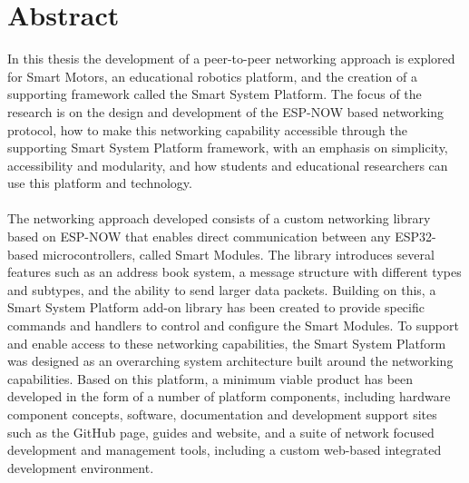 \chapter*{Abstract}%
%
%
%

In this thesis the development of a peer-to-peer networking approach is explored for Smart Motors, an educational robotics platform, and the creation of a supporting framework called the Smart System Platform. The focus of the research is on the design and development of the ESP-NOW based networking protocol, how to make this networking capability accessible through the supporting Smart System Platform framework, with an emphasis on simplicity, accessibility and modularity, and how students and educational researchers can use this platform and technology. \\\\

The networking approach developed consists of a custom networking library based on ESP-NOW that enables direct communication between any ESP32-based microcontrollers, called Smart Modules. The library introduces several features such as an address book system, a message structure with different types and subtypes, and the ability to send larger data packets. Building on this, a Smart System Platform add-on library has been created to provide specific commands and handlers to control and configure the Smart Modules. To support and enable access to these networking capabilities, the Smart System Platform was designed as an overarching system architecture built around the networking capabilities. Based on this platform, a minimum viable product has been developed in the form of a number of platform components, including hardware component concepts, software, documentation and development support sites such as the GitHub page, guides and website, and a suite of network focused development and management tools, including a custom web-based integrated development environment. \\\\

